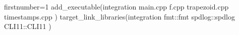 \begin{cmakecode*}{firstnumber=1}
add_executable(integration 
  main.cpp f.cpp trapezoid.cpp timestamps.cpp
)
target_link_libraries(integration 
  fmt::fmt spdlog::spdlog CLI11::CLI11
)
\end{cmakecode*}
